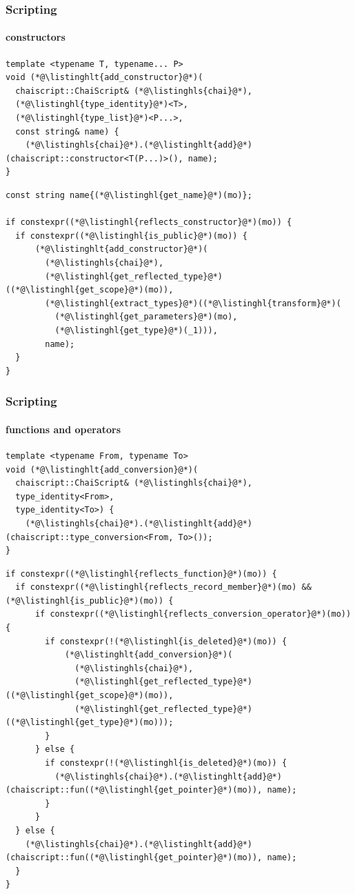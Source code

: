 \documentclass[compress,table,xcolor=table]{beamer}
\begin{document}
\begin{frame}[fragile]
  \frametitle{Scripting}
  \framesubtitle{constructors}
  \begin{lstlisting}[language=c++2x,basicstyle=\scriptsize\ttfamily]
template <typename T, typename... P>
void (*@\listinghlt{add_constructor}@*)(
  chaiscript::ChaiScript& (*@\listinghls{chai}@*),
  (*@\listinghl{type_identity}@*)<T>,
  (*@\listinghl{type_list}@*)<P...>,
  const string& name) {
    (*@\listinghls{chai}@*).(*@\listinghlt{add}@*)(chaiscript::constructor<T(P...)>(), name);
}
  \end{lstlisting}
  \begin{lstlisting}[language=c++2x,basicstyle=\scriptsize\ttfamily]
const string name{(*@\listinghl{get_name}@*)(mo)};

if constexpr((*@\listinghl{reflects_constructor}@*)(mo)) {
  if constexpr((*@\listinghl{is_public}@*)(mo)) {
      (*@\listinghlt{add_constructor}@*)(
        (*@\listinghls{chai}@*),
        (*@\listinghl{get_reflected_type}@*)((*@\listinghl{get_scope}@*)(mo)),
        (*@\listinghl{extract_types}@*)((*@\listinghl{transform}@*)(
          (*@\listinghl{get_parameters}@*)(mo),
          (*@\listinghl{get_type}@*)(_1))),
        name);
  }
}
  \end{lstlisting}
\end{frame}
\begin{frame}[fragile]
  \frametitle{Scripting}
  \framesubtitle{functions and operators}
  \begin{lstlisting}[language=c++2x,basicstyle=\scriptsize\ttfamily]
template <typename From, typename To>
void (*@\listinghlt{add_conversion}@*)(
  chaiscript::ChaiScript& (*@\listinghls{chai}@*),
  type_identity<From>,
  type_identity<To>) {
    (*@\listinghls{chai}@*).(*@\listinghlt{add}@*)(chaiscript::type_conversion<From, To>());
}
  \end{lstlisting}
  \begin{lstlisting}[language=c++2x,basicstyle=\tiny\ttfamily]
if constexpr((*@\listinghl{reflects_function}@*)(mo)) {
  if constexpr((*@\listinghl{reflects_record_member}@*)(mo) && (*@\listinghl{is_public}@*)(mo)) {
      if constexpr((*@\listinghl{reflects_conversion_operator}@*)(mo)) {
        if constexpr(!(*@\listinghl{is_deleted}@*)(mo)) {
            (*@\listinghlt{add_conversion}@*)(
              (*@\listinghls{chai}@*),
              (*@\listinghl{get_reflected_type}@*)((*@\listinghl{get_scope}@*)(mo)),
              (*@\listinghl{get_reflected_type}@*)((*@\listinghl{get_type}@*)(mo)));
        }
      } else {
        if constexpr(!(*@\listinghl{is_deleted}@*)(mo)) {
          (*@\listinghls{chai}@*).(*@\listinghlt{add}@*)(chaiscript::fun((*@\listinghl{get_pointer}@*)(mo)), name);
        }
      }
  } else {
    (*@\listinghls{chai}@*).(*@\listinghlt{add}@*)(chaiscript::fun((*@\listinghl{get_pointer}@*)(mo)), name);
  }
}
  \end{lstlisting}
\end{frame}
\end{document}
